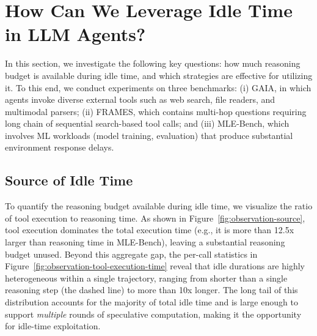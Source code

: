 
\section{How Can We Leverage Idle Time in LLM Agents?}\label{sec:observation}
In this section, we investigate the following key questions: how much reasoning budget is available during idle time, and which strategies are effective for utilizing it. To this end, we conduct experiments on 
three benchmarks:
(i) GAIA, in which agents invoke diverse external tools such as web 
search, file readers, and multimodal parsers;
(ii) FRAMES, which contains multi-hop questions requiring long chain
of sequential search-based tool calls; and
(iii) MLE-Bench, which involves ML workloads (model training, 
evaluation) that produce substantial environment response delays.

\subsection{Source of Idle Time}
To quantify the reasoning budget available during idle time, we visualize
the ratio of tool execution to reasoning time. As shown in
Figure~\ref{fig:observation-source}, tool execution
dominates the total execution time (e.g., it is more than 12.5x larger
than reasoning time in MLE-Bench), leaving a substantial reasoning budget
unused.
Beyond this aggregate gap, the per-call statistics in Figure~\ref{fig:observation-tool-execution-time} reveal that idle durations are highly heterogeneous within a single trajectory, ranging from shorter than a single reasoning step (the dashed line) to more than 10x longer. The long tail of this distribution accounts for the majority of total idle time and is large enough to support \emph{multiple} rounds of speculative computation, making it the opportunity for idle-time exploitation.

